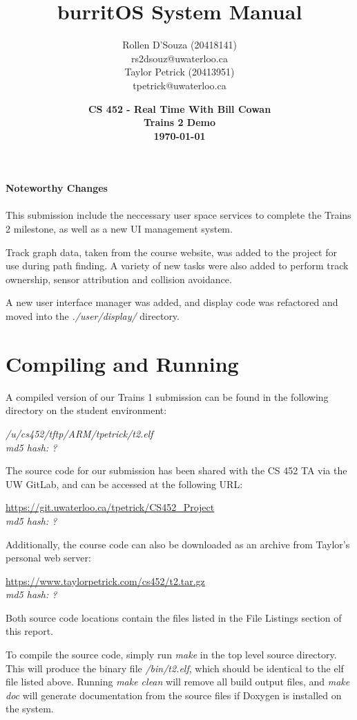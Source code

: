 \documentclass[twoside,a4paper]{refart}
\title{burritOS System Manual}
\author{Rollen D'Souza (20418141) \\
rs2dsouz@uwaterloo.ca \\
Taylor Petrick (20413951) \\
tpetrick@uwaterloo.ca \\}
\date{\textbf{CS 452 - Real Time With Bill Cowan \\ Trains 2 Demo \\ \today}}
\begin{document}
\maketitle


\textbf{Noteworthy Changes}\\\\
This submission include the neccessary user space services to complete the Trains 2 milestone, as well as a new UI management system.

Track graph data, taken from the course website, was added to the project for use during path finding. A variety of new tasks were also added to perform track ownership, sensor attribution and collision avoidance.

A new user interface manager was added, and display code was refactored and moved into the \textit{./user/display/} directory.

\newpage
\tableofcontents
\newpage


\section{Compiling and Running}
A compiled version of our Trains 1 submission can be found in the following directory on the student environment:
\begin{center}
\textit{/u/cs452/tftp/ARM/tpetrick/t2.elf}\\
\textit{md5 hash: ?}
\end{center}
The source code for our submission has been shared with the CS 452 TA via the UW GitLab, and can be accessed at the following URL:
\begin{center}
\url{https://git.uwaterloo.ca/tpetrick/CS452_Project}\\
\textit{md5 hash: ?}
\end{center}
Additionally, the course code can also be downloaded as an archive from Taylor’s personal web server:
\begin{center}
\url{https://www.taylorpetrick.com/cs452/t2.tar.gz}\\
\textit{md5 hash: ?}
\end{center}
Both source code locations contain the files listed in the File Listings section of this report.

To compile the source code, simply run \textit{make} in the top level source directory. This will produce the binary file \textit{/bin/t2.elf}, which should be identical to the elf file listed above. Running \textit{make clean} will remove all build output files, and \textit{make doc} will generate documentation from the source files if Doxygen is installed on the system.
\end{document}
